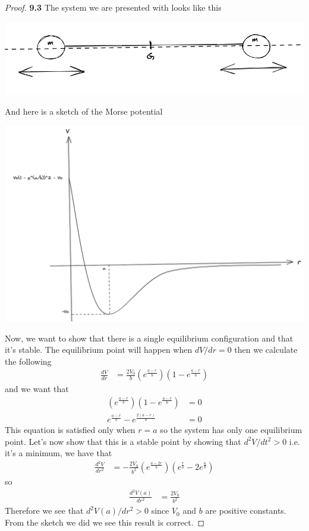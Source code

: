 \documentclass[11pt]{article}
\theoremstyle{definition}
\begin{document}
\cleardoublepage
	\begin{proof}{\textbf{9.3}}
        The system we are presented with looks like this
        \begin{center}
            \includegraphics[scale=0.5]{ch9-3_1.png}
        \end{center}
        And here is a sketch of the Morse potential
        \begin{center}
            \includegraphics[scale=0.3]{ch9-3_2.png}
        \end{center}

        Now, we want to show that there is a single equilibrium configuration
        and that it's stable. The equilibrium point will happen when $dV/dr=0$
        then we calculate the following
        \begin{align*}
            \frac{dV}{dr} &= \frac{2V_0}{b}(e^\frac{a-r}{b})(1 - e^\frac{a-r}{b})
        \end{align*}
        and we want that
        \begin{align*}
            (e^\frac{a-r}{b})(1 - e^\frac{a-r}{b}) &= 0\\
            e^\frac{a-r}{b} - e^\frac{2(a-r)}{b} &= 0
        \end{align*}
        This equation is satisfied only when $r = a$ so the system has only
        one equilibrium point. Let's now show that this is a stable point by
        showing that $d^2V/dt^2 > 0$ i.e. it's a minimum, we have that
        \begin{align*}
            \frac{d^2V}{dr^2} &= -\frac{2V_0}{b^2}(e^\frac{a-2r}{b})
            (e^\frac{r}{b} - 2e^\frac{a}{b})
        \end{align*}
        so
        \begin{align*}
            \frac{d^2V(a)}{dr^2} &= \frac{2V_0}{b^2}
        \end{align*}
        Therefore we see that ${d^2V(a)}/{dr^2} > 0$ since $V_0$ and $b$ are
        positive constants. From the sketch we did we see this result is
        correct.


\end{proof}
\end{document}
